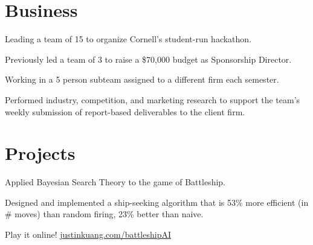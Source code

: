 \documentclass[]{deedy-resume-openfont}
\begin{document}
\begin{minipage}[t]{0.66\textwidth}
\section{Business}

\begin{tightemize}
\item Leading a team of 15 to organize Cornell's student-run hackathon.
\item Previously led a team of 3 to raise a \$70,000 budget as Sponsorship Director.
\end{tightemize}
\sectionsep

\begin{tightemize}
\item Working in a 5 person subteam assigned to a different firm each semester.
\item Performed industry, competition, and marketing research to support the team's weekly submission of report-based deliverables to the client firm.
\end{tightemize}
\sectionsep


\section{Projects}

\begin{tightemize}
\item Applied Bayesian Search Theory to the game of Battleship. 
\item Designed and implemented a ship-seeking algorithm that is 53\% more efficient (in \# moves) than random firing, 23\% better than naive.
\item Play it online! \href{https://justinkuang.com/battleshipAI}{\underline{justinkuang.com/battleshipAI}}

\end{tightemize}
\sectionsep





\end{minipage}
\end{document}
